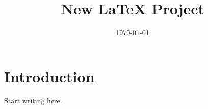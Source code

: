 \documentclass{article}
\title{New LaTeX Project}
\author{}
\date{\today}
\begin{document}
\maketitle

\section{Introduction}

Start writing here.
\end{document}
